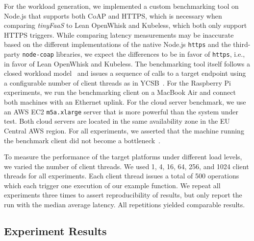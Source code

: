 For the workload generation, we implemented a custom benchmarking tool on Node.js that supports both CoAP and HTTPS, which is necessary when comparing \textit{tinyFaaS} to Lean OpenWhisk and Kubeless, which both only support HTTPS triggers.
While comparing latency measurements may be inaccurate based on the different implementations of the native Node.js \texttt{https} and the third-party \texttt{node-coap} libraries, we expect the differences to be in favor of \texttt{https}, i.e., in favor of Lean OpenWhisk and Kubeless.
The benchmarking tool itself follows a closed workload model~\cite{paper_schroeder_open_closed_workloads,book_bermbach_cloud_service_benchmarking} and issues a sequence of calls to a target endpoint using a configurable number of client threads as in YCSB~\cite{paper_cooper_ycsb}.
For the Raspberry Pi experiments, we run the benchmarking client on a MacBook Air and connect both machines with an Ethernet uplink.
For the cloud server benchmark, we use an AWS EC2 \texttt{m5a.xlarge} server that is more powerful than the system under test.
Both cloud servers are located in the same availability zone in the EU Central AWS region.
For all experiments, we asserted that the machine running the benchmark client did not become a bottleneck~\cite{book_bermbach_cloud_service_benchmarking}.

To measure the performance of the target platforms under different load levels, we varied the number of client threads.
We used 1, 4, 16, 64, 256, and 1024 client threads for all experiments.
Each client thread issues a total of 500 operations which each trigger one execution of our example function.
We repeat all experiments three times to assert reproducibility of results, but only report the run with the median average latency.
All repetitions yielded comparable results.


\subsection{Experiment Results}
\label{sec:discussion}

